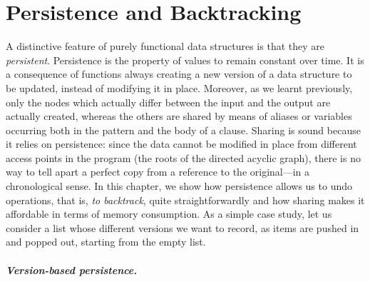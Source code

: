 
\chapter{Persistence and Backtracking}
\label{chap:persistence_and_backtracking}

A distinctive feature of purely functional data structures is that
they are \emph{persistent}. Persistence is the property of values to
remain constant over time. It is a consequence of \Erlang functions
always creating a new version of a data structure to be updated,
instead of modifying it in place. Moreover, as we learnt previously,
only the nodes which actually differ between the input and the output
are actually created, whereas the others are shared by means of
aliases or variables occurring both in the pattern and the body of a
clause. Sharing is sound because it relies on persistence: since the
data cannot be modified in place from different access points in the
program (the roots of the directed acyclic graph), there is no way to
tell apart a perfect copy from a reference to the original---in a
chronological sense. In this chapter, we show how persistence allows
us to undo operations, that is, \emph{to backtrack}, quite
straightforwardly and how sharing makes it affordable in terms of
memory consumption. As a simple case study, let us consider a list
whose different versions we want to record, as items are pushed in and
popped out, starting from the empty list.

\medskip

\paragraph{Version\hyp{}based persistence.}

